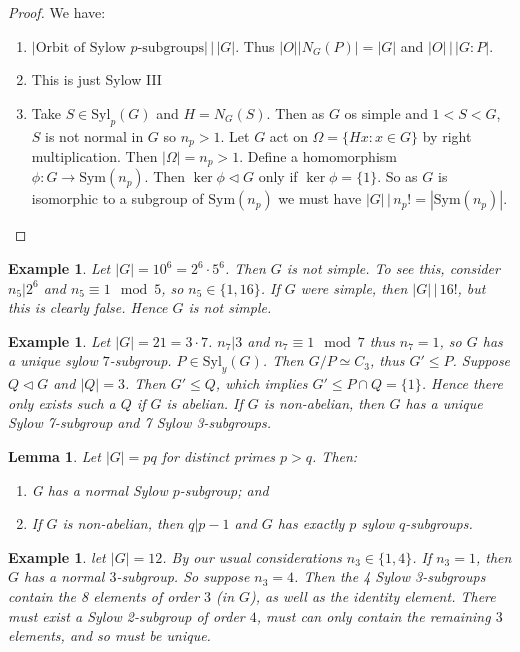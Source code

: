 \documentclass[a4paper,10pt]{article}
\newtheorem{eg}[thm]{Example}
\newtheorem{Lem}[thm]{Lemma}
\begin{document}
\begin{proof}
We have:
\begin{enumerate}
\item $|\text{Orbit of Sylow }p\text{-subgroups}| \, \big| \, |G|$. Thus $|O| |N_G(P)| = |G|$ and $|O| \, \big| \, |G:P|$.
\item This is just Sylow III
\item Take $S \in \text{Syl}_p(G)$ and $H = N_G(S)$. Then as $G$ os simple and $1 < S < G$, $S$ is not normal in $G$ so $n_p > 1$. Let $G$ act on $\Omega = \{ Hx : x \in G \}$ by right multiplication. Then $|\Omega| = n_p > 1$. Define a homomorphism $\phi : G \rightarrow \text{Sym}(n_p)$. Then $\ker \phi \triangleleft G$ only if $\ker \phi = \{1\}$. So as $G$ is isomorphic to a subgroup of $\text{Sym}(n_p)$ we must have $|G| \, \big| \, n_p! = |\text{Sym}(n_p)|$. 
\end{enumerate}
\end{proof}

\begin{eg}
Let $|G| = 10^6 = 2^6 \cdot 5^6$. Then $G$ is not simple. To see this, consider $n_5 | 2^6$ and $n_5 \equiv 1 \mod 5$, so $n_5 \in \{1, 16\}$. If $G$ were simple, then $|G| \, \big| \, 16!$, but this is clearly false. Hence $G$ is not simple. 
\end{eg}

\begin{eg}
Let $|G| = 21 = 3 \cdot 7$. $n_7 | 3$ and $n_7 \equiv 1 \mod 7$ thus $n_7 = 1$, so $G$ has a unique sylow $7$-subgroup. $P \in \text{Syl}_y(G)$. Then $G / P \simeq C_3$, thus $G' \leq P$. Suppose $Q \triangleleft G$ and $|Q| = 3$. Then $G' \leq Q$, which implies $G' \leq P \cap Q = \{1\}$. Hence there only exists such a $Q$ if $G$ is abelian. If $G$ is non-abelian, then $G$ has a unique Sylow 7-subgroup and 7 Sylow 3-subgroups. 
\end{eg}

\begin{Lem}
Let $|G| = pq$ for distinct primes $p > q$. Then:
\begin{enumerate}
\item G has a normal Sylow $p$-subgroup; and
\item If $G$ is non-abelian, then $q | p -1$ and $G$ has exactly $p$ sylow $q$-subgroups.
\end{enumerate}
\end{Lem}

\begin{eg}
let $|G| = 12$. By our usual considerations $n_3 \in \{1,4\}$. If $n_3 = 1$, then $G$ has a normal $3$-subgroup. So suppose $n_3 = 4$. Then the 4 Sylow 3-subgroups contain the 8 elements of order $3$ (in $G$), as well as the identity element. There must exist a Sylow 2-subgroup of order $4$, must can only contain the remaining $3$ elements, and so must be unique. 
\end{eg}
\end{document}
